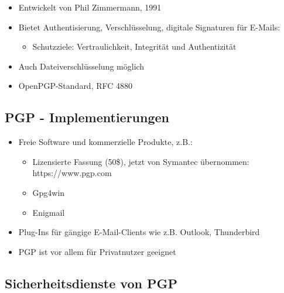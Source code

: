 \documentclass[openany]{book}
\begin{document}
\begin{itemize}
    \item Entwickelt von Phil Zimmermann, 1991
    \item Bietet Authentisierung, Verschlüsselung, digitale Signaturen für E-Mails:
    \begin{itemize}
        \item Schutzziele: Vertraulichkeit, Integrität und Authentizität
    \end{itemize}
    \item Auch Dateiverschlüsselung möglich
    \item OpenPGP-Standard, RFC 4880
\end{itemize}

\subsection{PGP - Implementierungen}

\begin{itemize}
    \item Freie Software und kommerzielle Produkte, z.B.:
    \begin{itemize}
        \item Lizensierte Fassung (50\$), jetzt von Symantec übernommen: https://www.pgp.com
        \item Gpg4win
        \item Enigmail
    \end{itemize}
    \item Plug-Ins für gängige E-Mail-Clients wie z.B. Outlook, Thunderbird
    \item PGP ist vor allem für Privatnutzer geeignet
\end{itemize}

\subsection{Sicherheitsdienste von PGP}
\end{document}
